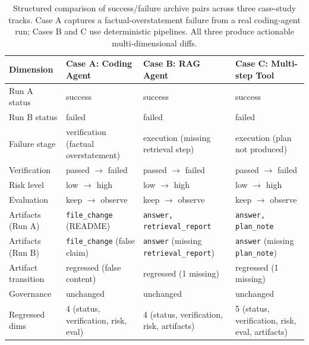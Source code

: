 \documentclass[11pt]{article}
\begin{document}
\begin{table}[t!]
  \centering
  \small
  \begin{tabular}{p{2.8cm}p{3.2cm}p{3.2cm}p{3.2cm}}
    \toprule
    \textbf{Dimension} & \textbf{Case A: Coding Agent} & \textbf{Case B: RAG Agent} & \textbf{Case C: Multi-step Tool} \\
    \midrule
    Run A status    & success                    & success                   & success \\
    Run B status    & failed                     & failed                    & failed \\
    \midrule
    Failure stage   & verification (factual overstatement) & execution (missing retrieval step) & execution (plan not produced) \\
    Verification    & passed $\rightarrow$ failed & passed $\rightarrow$ failed & passed $\rightarrow$ failed \\
    Risk level      & low $\rightarrow$ high     & low $\rightarrow$ high    & low $\rightarrow$ high \\
    Evaluation      & keep $\rightarrow$ observe & keep $\rightarrow$ observe & keep $\rightarrow$ observe \\
    \midrule
    Artifacts (Run A) & \texttt{file\_change} (README) & \texttt{answer, retrieval\_report} & \texttt{answer, plan\_note} \\
    Artifacts (Run B) & \texttt{file\_change} (false claim) & \texttt{answer} (missing \texttt{retrieval\_report}) & \texttt{answer} (missing \texttt{plan\_note}) \\
    Artifact transition & regressed (false content)  & regressed (1 missing)  & regressed (1 missing) \\
    \midrule
    Governance      & unchanged                  & unchanged                 & unchanged \\
    \midrule
    Regressed dims  & 4 (status, verification, risk, eval) & 4 (status, verification, risk, artifacts) & 5 (status, verification, risk, eval, artifacts) \\
    \bottomrule
  \end{tabular}
  \caption{Structured comparison of success/failure archive pairs across three case-study tracks. Case A captures a factual-overstatement failure from a real coding-agent run; Cases B and C use deterministic pipelines. All three produce actionable multi-dimensional diffs.}
  \label{tab:case-studies}
\end{table}
\end{document}
